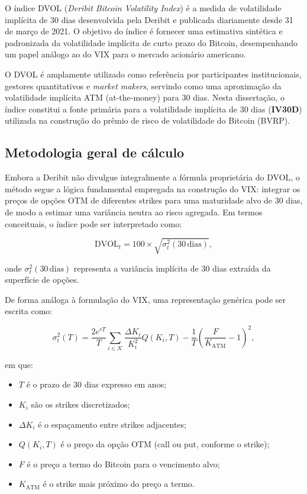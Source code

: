 O índice DVOL (\textit{Deribit Bitcoin Volatility Index}) é a medida de volatilidade
implícita de 30 dias desenvolvida pela Deribit e publicada diariamente desde
31 de março de 2021. O objetivo do índice é fornecer uma estimativa sintética e
padronizada da volatilidade implícita de curto prazo do Bitcoin, desempenhando um
papel análogo ao do VIX para o mercado acionário americano.

O DVOL é amplamente utilizado como referência por participantes institucionais,
gestores quantitativos e \textit{market makers}, servindo como uma aproximação da
volatilidade implícita ATM (at-the-money) para 30 dias. Nesta dissertação, o índice
constitui a fonte primária para a volatilidade implícita de 30 dias (\textbf{IV30D})
utilizada na construção do prêmio de risco de volatilidade do Bitcoin (BVRP).

\subsection{Metodologia geral de cálculo}

Embora a Deribit não divulgue integralmente a fórmula proprietária do DVOL,
o método segue a lógica fundamental empregada na construção do VIX: integrar os
preços de opções OTM de diferentes strikes para uma maturidade alvo de 30 dias,
de modo a estimar uma variância neutra ao risco agregada. Em termos conceituais,
o índice pode ser interpretado como:

\[
\text{DVOL}_t = 100 \times \sqrt{ \sigma^2_{t}(30\,\text{dias}) },
\]

onde $\sigma^2_{t}(30\,\text{dias})$ representa a variância implícita de 30 dias
extraída da superfície de opções.

De forma análoga à formulação do VIX, uma representação genérica pode ser
escrita como:

\[
\sigma^2_{t}(T) = 
\frac{2 e^{rT}}{T}
\sum_{i \in \mathcal{K}} 
\frac{\Delta K_i}{K_i^2} Q(K_i, T)
-
\frac{1}{T}
\left( \frac{F}{K_{\text{ATM}}} - 1 \right)^2,
\]

em que:

\begin{itemize}
    \item $T$ é o prazo de 30 dias expresso em anos;
    \item $K_i$ são os strikes discretizados;
    \item $\Delta K_i$ é o espaçamento entre strikes adjacentes;
    \item $Q(K_i, T)$ é o preço da opção OTM (call ou put, conforme o strike);
    \item $F$ é o preço a termo do Bitcoin para o vencimento alvo;
    \item $K_{\text{ATM}}$ é o strike mais próximo do preço a termo.
\end{itemize}

